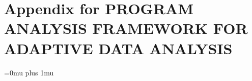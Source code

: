 \documentclass[12pt, letterpaper]{report}   %
\begin{document}
\chapter{Appendix for PROGRAM ANALYSIS FRAMEWORK FOR ADAPTIVE DATA ANALYSIS}
\label{apdx:adapt}





% 



\newpage
\singlespace
\Urlmuskip=0mu plus 1mu\relax %
\end{document}
